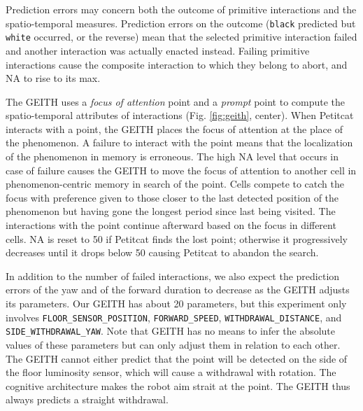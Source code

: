 \documentclass[runningheads]{llncs}
\begin{document}
Prediction errors may concern both the outcome of primitive interactions and the spatio-temporal measures.
Prediction errors on the outcome (\texttt{black} predicted but \texttt{white} occurred, or the reverse) mean that the selected primitive interaction failed and another interaction was actually enacted instead. 
Failing primitive interactions cause the composite interaction to which they belong to abort, and NA to rise to its max.

The GEITH uses a \textit{focus of attention} point and a \textit{prompt} point to compute the spatio-temporal attributes of interactions (Fig. \ref{fig:geith}, center). 
When Petitcat interacts with a point, the GEITH places the focus of attention at the place of the phenomenon. 
A failure to interact with the point means that the localization of the phenomenon in memory is erroneous. 
The high NA level that occurs in case of failure causes the GEITH to move the focus of attention to another cell in phenomenon-centric memory in search of the point.
Cells compete to catch the focus with preference given to those closer to the last detected position of the phenomenon but having gone the longest period since last being visited.
The interactions with the point continue afterward based on the focus in different cells. 
NA is reset to 50 if Petitcat finds the lost point; otherwise it progressively decreases until it drops below 50 causing Petitcat to abandon the search. 

In addition to the number of failed interactions, we also expect the prediction errors of the yaw and of the forward duration to decrease as the GEITH adjusts its parameters. 
Our GEITH has about 20 parameters, but this experiment only involves \texttt{FLOOR\_SENSOR\_POSITION}, \texttt{FORWARD\_SPEED}, \texttt{WITHDRAWAL\_DIS\-TANCE}, and \texttt{SIDE\_WITH\-DRA\-WAL\_YAW}.
Note that GEITH has no means to infer the absolute values of these parameters but can only adjust them in relation to each other.
The GEITH cannot either predict that the point will be detected on the side of the floor luminosity sensor, which will cause a withdrawal with rotation. 
The cognitive architecture makes the robot aim strait at the point.
The GEITH thus always predicts a straight withdrawal. 

\end{document}
